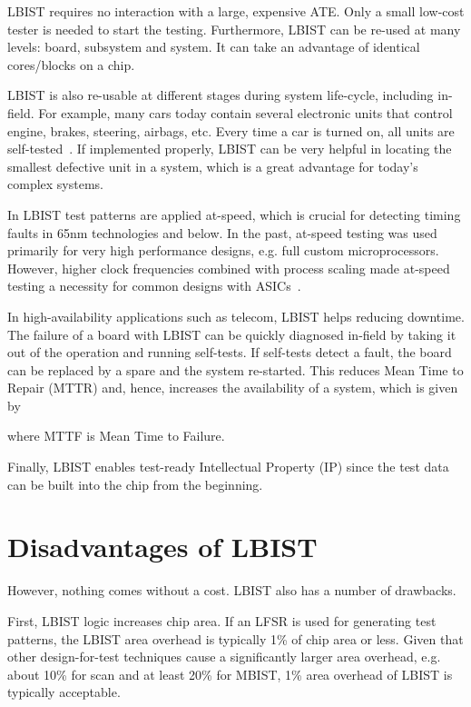 \documentclass[conference]{IEEEtran}
\begin{document}
LBIST requires no interaction with a large, expensive ATE. Only a small low-cost tester is needed to start the testing. Furthermore, LBIST can be re-used at many levels: board, subsystem and system. It can take an advantage of identical cores/blocks on a chip. 

LBIST is also re-usable at different stages during system life-cycle, including in-field.
For example, many cars today contain several electronic units that control engine, brakes, steering, airbags, etc. Every time a car is turned on, all units are self-tested~\cite{MePZ12}. 
If implemented properly, LBIST can be very helpful in locating the smallest defective unit in a system, which is a great advantage for today's complex systems.


In LBIST test patterns are applied at-speed, which is crucial for detecting timing faults in 65nm technologies and below. In the past, at-speed testing was used primarily for very high performance designs, e.g. full custom microprocessors. However, higher clock frequencies combined with process scaling made at-speed testing a necessity for common designs with ASICs~\cite{Ma13}.

In high-availability applications such as telecom, LBIST helps reducing downtime. 
The failure of a board with LBIST can be quickly diagnosed in-field by taking it out of the operation and running self-tests. If self-tests detect a fault, the board can be replaced by a spare and the system re-started. This reduces Mean Time to Repair (MTTR) and, hence, increases 
the availability of a system, which is given by

where MTTF is Mean Time to Failure.

Finally, LBIST enables test-ready Intellectual Property (IP) since the test data can be built into the chip from the beginning. 



\section{Disadvantages of LBIST} \label{dis}

However, nothing comes without a cost. LBIST also has a number of drawbacks.

First, LBIST logic increases chip area. If an LFSR is used for generating test patterns, the LBIST area overhead is typically 1\% of chip area or less. Given that other design-for-test techniques cause a significantly larger area overhead, e.g. about 10\% for scan and at least 20\% for MBIST, 1\% area overhead of LBIST is typically acceptable.
\end{document}
